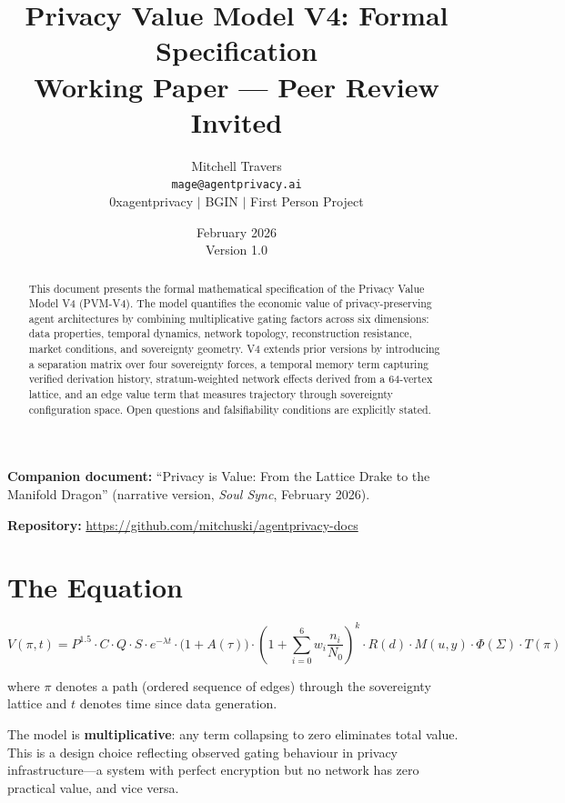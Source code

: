 \documentclass[11pt,a4paper]{article}
\title{
    \vspace{-1cm}
    \textbf{Privacy Value Model V4: Formal Specification}\\[0.5em]
    \large Working Paper --- Peer Review Invited
}
\author{
    Mitchell Travers\\
    \texttt{mage@agentprivacy.ai}\\[0.3em]
    \small 0xagentprivacy $\mid$ BGIN $\mid$ First Person Project
}
\date{February 2026 \\ \small Version 1.0}
\begin{document}
\maketitle

\begin{abstract}
This document presents the formal mathematical specification of the Privacy Value Model V4 (PVM-V4). The model quantifies the economic value of privacy-preserving agent architectures by combining multiplicative gating factors across six dimensions: data properties, temporal dynamics, network topology, reconstruction resistance, market conditions, and sovereignty geometry. V4 extends prior versions by introducing a separation matrix over four sovereignty forces, a temporal memory term capturing verified derivation history, stratum-weighted network effects derived from a 64-vertex lattice, and an edge value term that measures trajectory through sovereignty configuration space. Open questions and falsifiability conditions are explicitly stated.
\end{abstract}

\vspace{0.5em}
\noindent\textbf{Companion document:} ``Privacy is Value: From the Lattice Drake to the Manifold Dragon'' (narrative version, \textit{Soul Sync}, February 2026).

\vspace{0.5em}
\noindent\textbf{Repository:} \url{https://github.com/mitchuski/agentprivacy-docs}

\tableofcontents
\newpage

\section{The Equation}

\begin{equation}\label{eq:pvm4}
\boxed{
V(\pi, t) = P^{1.5} \cdot C \cdot Q \cdot S \cdot e^{-\lambda t} \cdot \bigl(1 + A(\tau)\bigr) \cdot \left(1 + \sum_{i=0}^{6} w_i \frac{n_i}{N_0}\right)^{\!k} \cdot R(d) \cdot M(u,y) \cdot \Phi(\Sigma) \cdot T(\pi)
}
\end{equation}

\noindent where $\pi$ denotes a path (ordered sequence of edges) through the sovereignty lattice and $t$ denotes time since data generation.

The model is \textbf{multiplicative}: any term collapsing to zero eliminates total value. This is a design choice reflecting observed gating behaviour in privacy infrastructure---a system with perfect encryption but no network has zero practical value, and vice versa.
\end{document}
